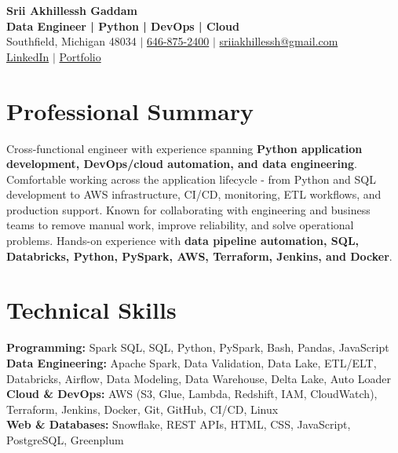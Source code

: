 \documentclass[letterpaper,10pt]{article}
\begin{document}
\fontsize{9.35pt}{10.45pt}\selectfont

\begin{center}
    {\LARGE \textbf{Srii Akhillessh Gaddam}} \\[-1pt]
    \textbf{Data Engineer | Python | DevOps | Cloud} \\[2pt]
    Southfield, Michigan 48034 $|$
    \href{tel:6468752400}{646-875-2400} $|$
    \href{mailto:sriiakhillessh@gmail.com}{sriiakhillessh@gmail.com} \\[1pt]
    \href{https://www.linkedin.com/in/srii-akhiilessh-gaddam-b48668191/}{LinkedIn} $|$
    \href{https://sriiakhillesshg.github.io/portfolio/}{Portfolio}
\end{center}
\vspace{-8pt}

\section{Professional Summary}
\small{Cross-functional engineer with experience spanning \textbf{Python application development, DevOps/cloud automation, and data engineering}. Comfortable working across the application lifecycle - from Python and SQL development to AWS infrastructure, CI/CD, monitoring, ETL workflows, and production support. Known for collaborating with engineering and business teams to remove manual work, improve reliability, and solve operational problems. Hands-on experience with \textbf{data pipeline automation, SQL, Databricks, Python, PySpark, AWS, Terraform, Jenkins, and Docker}.}

\section{Technical Skills}
\small{
\textbf{Programming:} Spark SQL, SQL, Python, PySpark, Bash, Pandas, JavaScript \\
\textbf{Data Engineering:} Apache Spark, Data Validation, Data Lake, ETL/ELT, Databricks, Airflow, Data Modeling, Data Warehouse, Delta Lake, Auto Loader \\
\textbf{Cloud \& DevOps:} AWS (S3, Glue, Lambda, Redshift, IAM, CloudWatch), Terraform, Jenkins, Docker, Git, GitHub, CI/CD, Linux \\
\textbf{Web \& Databases:} Snowflake, REST APIs, HTML, CSS, JavaScript, PostgreSQL, Greenplum
}
\end{document}
